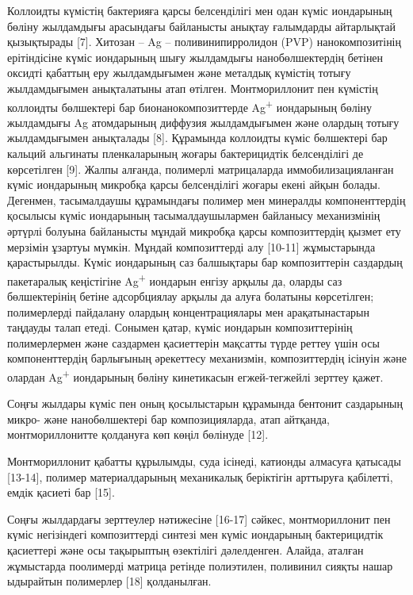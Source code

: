 \begin{multicols}{2}
Коллоидты күмістің бактерияға қарсы белсенділігі мен одан күміс
иондарының бөліну жылдамдығы арасындағы байланысты анықтау ғалымдарды
айтарлықтай қызықтырады {[}7{]}. Хитозан -- Ag -- поливинипирролидон
(PVP) нанокомпозитінің ерітіндісіне күміс иондарының шығу жылдамдығы
нанобөлшектердің бетінен оксидті қабаттың еру жылдамдығымен және
металдық күмістің тотығу жылдамдығымен анықталатыны атап өтілген.
Монтмориллонит пен күмістің коллоидты бөлшектері бар
бионанокомпозиттерде Ag\textsuperscript{+} иондарының бөліну жылдамдығы
Ag атомдарының диффузия жылдамдығымен және олардың тотығу жылдамдығымен
анықталады {[}8{]}. Құрамында коллоидты күміс бөлшектері бар кальций
альгинаты пленкаларының жоғары бактерицидтік белсенділігі де көрсетілген
{[}9{]}. Жалпы алғанда, полимерлі матрицаларда иммобилизацияланған күміс
иондарының микробқа қарсы белсенділігі жоғары екені айқын болады.
Дегенмен, тасымалдаушы құрамындағы полимер мен минералды компоненттердің
қосылысы күміс иондарының тасымалдаушылармен байланысу механизмінің
әртүрлі болуына байланысты мұндай микробқа қарсы композиттердің қызмет
ету мерзімін ұзартуы мүмкін. Мұндай композиттерді алу {[}10-11{]}
жұмыстарында қарастырылды. Күміс иондарының саз балшықтары бар
композиттерін саздардың пакетаралық кеңістігіне Ag\textsuperscript{+}
иондарын енгізу арқылы да, оларды саз бөлшектерінің бетіне адсорбциялау
арқылы да алуға болатыны көрсетілген; полимерлерді пайдалану олардың
концентрациялары мен арақатынастарын таңдауды талап етеді. Сонымен
қатар, күміс иондарын композиттерінің полимерлермен және саздармен
қасиеттерін мақсатты түрде реттеу үшін осы компоненттердің барлығының
әрекеттесу механизмін, композиттердің ісінуін және олардан
Ag\textsuperscript{+} иондарының бөліну кинетикасын егжей-тегжейлі
зерттеу қажет.

Соңғы жылдары күміс пен оның қосылыстарын құрамында бентонит саздарының
микро- және нанобөлшектері бар композицияларда, атап айтқанда,
монтмориллонитте қолдануға көп көңіл бөлінуде {[}12{]}.

Монтмориллонит қабатты құрылымды, суда ісінеді, катионды алмасуға
қатысады {[}13-14{]}, полимер материалдарының механикалық беріктігін
арттыруға қабілетті, емдік қасиеті бар {[}15{]}.

Соңғы жылдардағы зерттеулер нәтижесіне {[}16-17{]} сәйкес,
монтмориллонит пен күміс негізіндегі композиттерді синтезі мен күміс
иондарының бактерицидтік қасиеттері және осы тақырыптың өзектілігі
дәлелденген. Алайда, аталған жұмыстарда поолимерді матрица ретінде
полиэтилен, поливинил сияқты нашар ыдырайтын полимерлер {[}18{]}
қолданылған.


\end{multicols}
